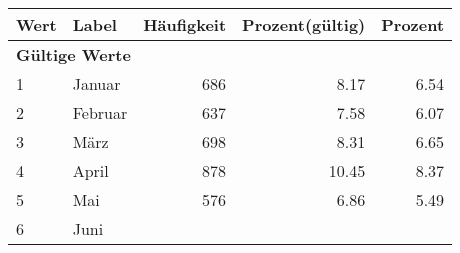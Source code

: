      \begin{longtable}{lXrrr}
     \toprule
     \textbf{Wert} & \textbf{Label} & \textbf{Häufigkeit} & \textbf{Prozent(gültig)} & \textbf{Prozent} \\
     \endhead
     \midrule
     \multicolumn{5}{l}{\textbf{Gültige Werte}}\\

     1 &
     \multicolumn{1}{X}{ Januar   } &


       \num{686} &
       \num[round-mode=places,round-precision=2]{8.17} &
         \num[round-mode=places,round-precision=2]{6.54} \\

     2 &
     \multicolumn{1}{X}{ Februar   } &


       \num{637} &
       \num[round-mode=places,round-precision=2]{7.58} &
         \num[round-mode=places,round-precision=2]{6.07} \\

     3 &
     \multicolumn{1}{X}{ März   } &


       \num{698} &
       \num[round-mode=places,round-precision=2]{8.31} &
         \num[round-mode=places,round-precision=2]{6.65} \\

     4 &
     \multicolumn{1}{X}{ April   } &


       \num{878} &
       \num[round-mode=places,round-precision=2]{10.45} &
         \num[round-mode=places,round-precision=2]{8.37} \\

     5 &
     \multicolumn{1}{X}{ Mai   } &


       \num{576} &
       \num[round-mode=places,round-precision=2]{6.86} &
         \num[round-mode=places,round-precision=2]{5.49} \\

     6 &
     \multicolumn{1}{X}{ Juni   } &



\end{longtable}
